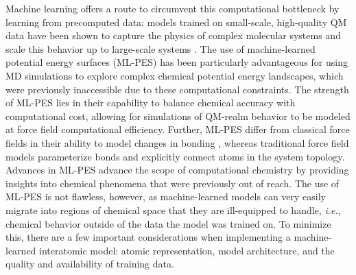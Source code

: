 Machine learning offers a route to circumvent this computational bottleneck by learning from precomputed data: models trained on small-scale, high-quality QM data have been shown to capture the physics of complex molecular systems and scale this behavior up to large-scale systems \cite{ml_mm_largescale}. 
The use of machine-learned potential energy surfaces (ML-PES) has been particularly advantageous for using MD simulations to explore complex chemical potential energy landscapes, which were previously inaccessible due to these computational constraints. 
The strength of ML-PES lies in their capability to balance chemical accuracy with computational cost, allowing for simulations of QM-realm behavior to be modeled at force field computational efficiency. 
Further, ML-PES differ from classical force fields in their ability to model changes in bonding \cite{reactive_nnp_behler, yinuo_reactive_MLPs}, whereas traditional force field models parameterize bonds and explicitly connect atoms in the system topology.
Advances in ML-PES advance the scope of computational chemistry by providing insights into chemical phenomena that were previously out of reach.
The use of ML-PES is not flawless, however, as machine-learned models can very easily migrate into regions of chemical space that they are ill-equipped to handle, \textit{i.e.}, chemical behavior outside of the data the model was trained on.
To minimize this, there are a few important considerations when implementing a machine-learned interatomic model: atomic representation, model architecture, and the quality and availability of training data.


